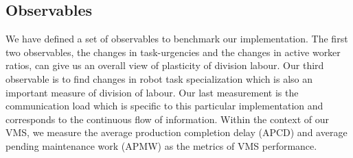\documentclass{llncs}
\begin{document}
\subsection{Observables}
We have defined a set of observables to benchmark our implementation. The first two observables, the changes in task-urgencies and the changes in active worker ratios, can give us an overall view of plasticity of division labour. Our third observable is to find changes in robot task specialization which is also an important measure of division of labour. Our last measurement is the communication load which is specific to this particular implementation and corresponds to the continuous flow of information. Within the context of our VMS, we measure the average production completion delay (APCD) and average pending maintenance work (APMW) as the metrics of VMS performance.
% 
\end{document}
